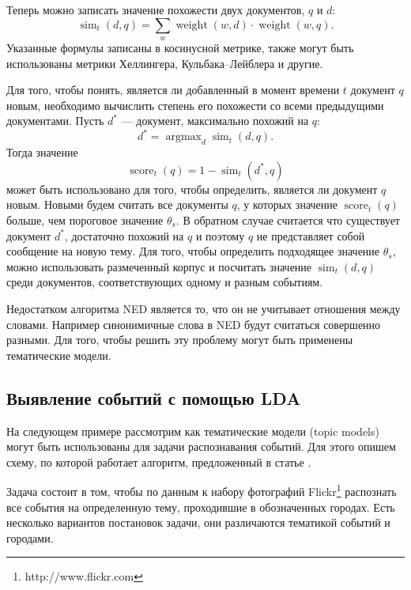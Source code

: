 \documentclass[12pt, a4paper]{article}
\DeclareMathOperator*{\argmax}{argmax}
\DeclareMathOperator{\weight}{weight}
\DeclareMathOperator{\score}{score}
\DeclareMathOperator{\simu}{sim}
\begin{document}
	Теперь можно записать значение похожести двух документов, $q$ и $d$:
	\begin{equation}
	\simu_t(d,q) = \sum_w \weight(w, d) \cdot \weight(w, q).
	\end{equation}
	Указанные формулы записаны в косинусной метрике, также могут быть использованы метрики Хеллингера, Кульбака--Лейблера и другие.
	
	Для того, чтобы понять, является ли добавленный в момент времени $t$ документ $q$ новым, необходимо вычислить степень его похожести со всеми предыдущими документами. Пусть $d^*$ --- документ, максимально похожий на $q$:
	\begin{equation}
	d^* = \argmax_d \simu_t (d,q).
	\end{equation}
	Тогда значение
	\begin{equation}
	\score_t(q) = 1 - \simu_t (d^*, q)
	\end{equation}
	может быть использовано для того, чтобы определить, является ли документ $q$ новым. Новыми будем считать все документы $q$, у которых значение $\score_t(q)$ больше, чем пороговое значение $\theta_s$. В обратном случае считается что существует документ $d^*$, достаточно похожий на $q$ и поэтому $q$ не представляет собой сообщение на новую тему. Для того, чтобы определить подходящее значение $\theta_s$, можно использовать размеченный корпус и посчитать значение $\simu_t (d,q)$ среди документов, соответствующих одному и разным событиям.
	
	Недостатком алгоритма NED является то, что он не учитывает отношения между словами. Например синонимичные слова в NED будут считаться совершенно разными. Для того, чтобы решить эту проблему могут быть применены тематические модели.
	
	\subsection{Выявление событий с помощью LDA}
  На следующем примере рассмотрим как тематические модели (topic models) могут быть использованы для задачи распознавания событий. Для этого опишем схему, по которой работает алгоритм, предложенный в статье \cite{mediaeval}. 
  
  Задача состоит в том, чтобы по данным к  набору фотографий Flickr\footnote{http://www.flickr.com} распознать все события на определенную тему, проходившие в обозначенных городах. Есть несколько вариантов постановок задачи, они различаются тематикой событий и городами. 
  
\end{document}

